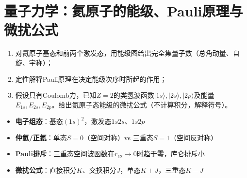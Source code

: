 \section{量子力学：氦原子的能级、Pauli原理与微扰公式}
\label{sec:helium-levels-pauli}

\begin{modelbox}
\begin{enumerate}
    \item 对氦原子基态和前两个激发态，用能级图给出完全集量子数（总角动量、自旋、宇称）；
    \item 定性解释Pauli原理在决定能级次序时所起的作用；
    \item 假设只有Coulomb力，已知$Z=2$的类氢波函数$|1s\rangle,|2s\rangle,|2p\rangle$及能量$E_{1s},E_{2s},E_{2p}$。给出氦原子态能级的微扰公式（不计算积分，解释符号）。
\end{enumerate}
\end{modelbox}

\begin{tipbox}[考点快速分析]
\begin{itemize}
    \item \textbf{电子组态}：基态$(1s)^2$，激发态$1s2s$、$1s2p$
    \item \textbf{仲氦/正氦}：单态$S=0$（空间对称）vs 三重态$S=1$（空间反对称）
    \item \textbf{Pauli排斥}：三重态空间波函数在$r_{12}\to0$时趋于零，库仑排斥小
    \item \textbf{微扰公式}：直接积分$K$、交换积分$J$，单态$K+J$，三重态$K-J$
\end{itemize}
\end{tipbox}

